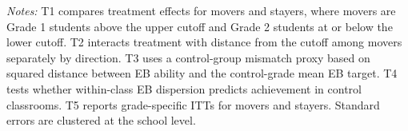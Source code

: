 \begin{table}[!htbp]
\begin{threeparttable}
\begin{tablenotes}
\footnotesize
\item \textit{Notes:} T1 compares treatment effects for movers and stayers, where movers are Grade 1 students above the upper cutoff and Grade 2 students at or below the lower cutoff. T2 interacts treatment with distance from the cutoff among movers separately by direction. T3 uses a control\mbox{-}group mismatch proxy based on squared distance between EB ability and the control-grade mean EB target. T4 tests whether within-class EB dispersion predicts achievement in control classrooms. T5 reports grade-specific ITTs for movers and stayers. Standard errors are clustered at the school level.
\end{tablenotes}
\end{threeparttable}
\end{table}
